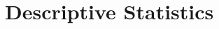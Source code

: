 \documentclass[12pt]{article}
\begin{document}







\section{Descriptive Statistics}\label{section:descriptives}
\end{document}
